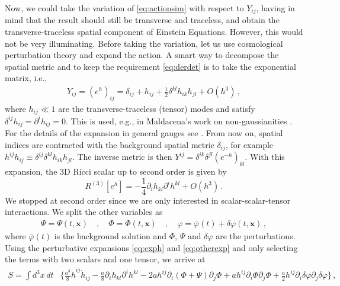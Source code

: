 \documentclass[a4paper,11pt]{article}
\numberwithin{equation}{section}
\begin{document}
Now, we could take the variation of \eqref{eq:actionsim} with respect to $Y_{ij}$, having in mind that the result should still be transverse and traceless, and obtain the transverse-traceless spatial component of Einstein Equations. However, this would not be very illuminating. Before taking the variation, let us use cosmological perturbation theory and expand the action. A smart way to decompose the spatial metric and to keep the requirement \eqref{eq:derdet} is to take the exponential matrix, i.e.,
\begin{align}\label{eq:exph}
Y_{ij}=(e^h)_{ij}=\delta_{ij}+h_{ij}+\frac{1}{2}\delta^{kl}h_{ik}h_{jl}+O(h^3)\,,
\end{align}
where $h_{ij}\ll1$ are the transverse-traceless (tensor) modes and satisfy $\delta^{ij}h_{ij}=\partial^i h_{ij}=0$. This is used, e.g., in Maldacena's work on non-gaussianities \cite{Maldacena:2002vr}. For the details of the expansion in general gauges see \cite{Domenech:2017ems}. From now on, spatial indices are contracted with the background spatial metric $\delta_{ij}$, for example $h^{ij}h_{ij}\equiv\delta^{ij}\delta^{kl}h_{ik}h_{jl}$. The inverse metric is then $Y^{ij}=\delta^{ik}\delta^{jl}(e^{-h})_{kl}$. With this expansion, the 3D Ricci scalar up to second order is given by
\begin{equation}
   R^{(3)}[e^h]=-\frac{1}{4}\partial_ih_{kl}\partial^ih^{kl}+O(h^3)\,.
\end{equation}
We stopped at second order since we are only interested in scalar-scalar-tensor interactions. We split the other variables as
\begin{align}\label{eq:otherexp}
\Psi=\Psi(t,\mathbf{x})\quad,\quad \Phi=\Phi(t,\mathbf{x})\quad,\quad \varphi=\bar\varphi(t)+\delta\varphi(t,\mathbf{x})\,,
\end{align}
where $\bar\varphi(t)$ is the background solution and $\Phi$, $\Psi$ and $\delta\varphi$ are the perturbations. Using the perturbative expansions \eqref{eq:exph} and \eqref{eq:otherexp} and only selecting the terms with two scalars and one tensor, we arrive at
\begin{equation}\label{eq:actionsim2}
      \begin{split}
         S=\int d^3x \,dt &\bigg\{\frac{a^3}{8}\dot h^{ij}\dot h_{ij} -\frac{a}{8}\partial_ih_{kl}\partial^ih^{kl}-2ah^{ij}\partial_i(\Phi+\Psi)\partial_j\Phi+ah^{ij} \partial_i \Phi \partial_j \Phi+\frac{a}{2}h^{ij} \partial_i \delta\varphi \partial_j \delta\varphi
         \bigg\}\,,
      \end{split}
\end{equation}
\end{document}
